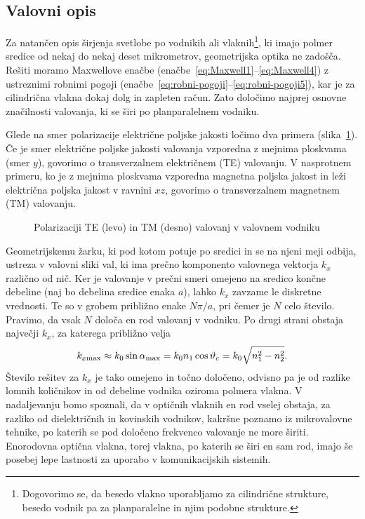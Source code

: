\subsection*{Valovni opis}
Za natančen opis širjenja svetlobe po vodnikih ali vlaknih\footnote{Dogovorimo se, da  
besedo vlakno uporabljamo za cilindrične strukture, besedo vodnik pa za planparalelne 
in njim podobne strukture.}, ki imajo polmer
sredice od nekaj do nekaj deset mikrometrov, geometrijska optika ne
zadošča. Rešiti moramo Maxwellove enačbe (enačbe~\ref{eq:Maxwell1}--\ref{eq:Maxwell4}) 
z ustreznimi robnimi pogoji (enačbe~\ref{eq:robni-pogoji}--\ref{eq:robni-pogoji5}),
kar je za cilindrična vlakna dokaj dolg in zapleten račun. Zato določimo najprej 
osnovne značilnosti valovanja, ki se širi po planparalelnem vodniku.

Glede na smer polarizacije električne poljske jakosti 
ločimo dva primera (slika~\ref{fig:TETM}). Če je smer električne poljske
jakosti valovanja vzporedna z mejnima ploskvama (smer $y$), 
govorimo o transverzalnem električnem (TE) valovanju. 
V nasprotnem primeru, ko je 
z mejnima ploskvama vzporedna magnetna poljska jakost in 
leži električna poljska jakost v ravnini $xz$, 
govorimo o transverzalnem magnetnem (TM) valovanju.
\begin{figure}[h]
\centering
\def\svgwidth{140truemm} 

\caption{Polarizaciji TE (levo) in TM (desno) valovanj v valovnem vodniku}
\label{fig:TETM}
\end{figure}

Geometrijskemu žarku, ki pod kotom potuje po sredici in se na njeni meji
odbija, ustreza v valovni sliki val, ki ima prečno komponento valovnega
vektorja $k_{x}$ različno od nič. Ker je valovanje v prečni smeri 
omejeno na sredico končne debeline (naj bo debelina sredice enaka $a$), lahko
$k_{x}$ zavzame le diskretne vrednosti. Te so v grobem približno enake $N\pi/a$, pri čemer je $N$
celo število. Pravimo, da vsak $N$ določa en rod valovanj v vodniku. Po drugi strani 
obstaja največji $k_x$, za katerega približno velja
\begin{equation}
k_{x \mathrm{max}} \approx k_0 \sin\alpha_{\rm max} = 
k_0 n_1 \cos\vartheta_c = k_0 \sqrt{n_1^2 -n_2^2}.
\end{equation}
Število rešitev za $k_x$ je tako omejeno in točno določeno, odvisno
pa je od razlike lomnih količnikov in od debeline vodnika oziroma polmera vlakna. 
V nadaljevanju bomo spoznali, da v optičnih vlaknih en rod vselej obstaja,
za razliko od dielektričnih in kovinskih vodnikov, kakršne
poznamo iz mikrovalovne tehnike, po katerih se pod določeno frekvenco
valovanje ne more širiti. Enorodovna optična vlakna, torej vlakna, po katerih se širi
en sam rod, imajo še posebej lepe lastnosti za uporabo v komunikacijskih
sistemih.

